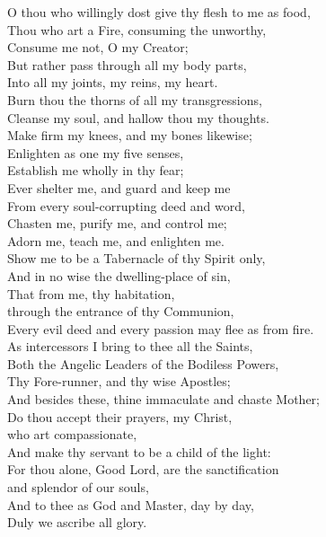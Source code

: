     O thou who willingly dost give thy flesh to me as food,\\
    Thou who art a Fire, consuming the unworthy,\\
    Consume me not, O my Creator;\\
    But rather pass through all my body parts,\\
    Into all my joints, my reins, my heart.\\
    Burn thou the thorns of all my transgressions,\\
    Cleanse my soul, and hallow thou my thoughts.\\
    Make firm my knees, and my bones likewise;\\
    Enlighten as one my five senses,\\
    Establish me wholly in thy fear;\\
    Ever shelter me, and guard and keep me\\
    From every soul-corrupting deed and word,\\
    Chasten me, purify me, and control me;\\
    Adorn me, teach me, and enlighten me.\\
    Show me to be a Tabernacle of thy Spirit only,\\
    And in no wise the dwelling-place of sin,\\
    That from me, thy habitation, \\
    \hspace*{2em} through the entrance of thy Communion,\\
    Every evil deed and every passion may flee as from fire.\\
    As intercessors I bring to thee all the Saints,\\
    Both the Angelic Leaders of the Bodiless Powers,\\
    Thy Fore-runner, and thy wise Apostles;\\
    And besides these, thine immaculate and chaste Mother;\\
    Do thou accept their prayers, my Christ, \\
    \hspace*{2em} who art compassionate,\\
    And make thy servant to be a child of the light:\\
    For thou alone, Good Lord, are the sanctification\\
    \hspace*{2em} and splendor of our souls,\\
    And to thee as God and Master, day by day,\\
    Duly we ascribe all glory.


